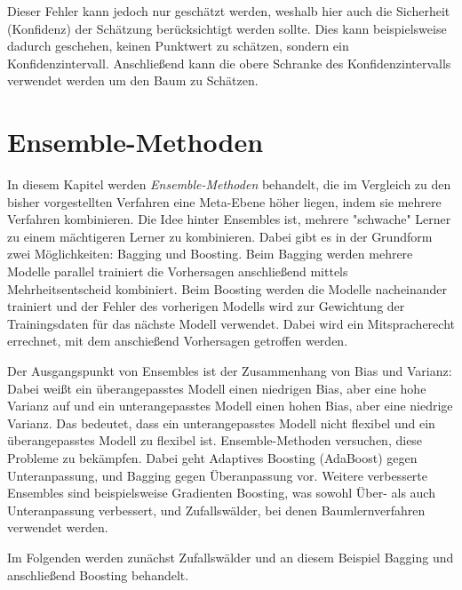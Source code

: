 		Dieser Fehler kann jedoch nur geschätzt werden, weshalb hier auch die Sicherheit (Konfidenz) der Schätzung berücksichtigt werden sollte. Dies kann beispielsweise dadurch geschehen, keinen Punktwert zu schätzen, sondern ein Konfidenzintervall. Anschließend kann die obere Schranke des Konfidenzintervalls verwendet werden um den Baum zu Schätzen.


\chapter{Ensemble-Methoden}
	In diesem Kapitel werden \emph{Ensemble-Methoden} behandelt, die im Vergleich zu den bisher vorgestellten Verfahren eine Meta-Ebene höher liegen, indem sie mehrere Verfahren kombinieren. Die Idee hinter Ensembles ist, mehrere "schwache" Lerner zu einem mächtigeren Lerner zu kombinieren. Dabei gibt es in der Grundform zwei Möglichkeiten: Bagging und Boosting. Beim Bagging werden mehrere Modelle parallel trainiert die Vorhersagen anschließend \bspw mittels Mehrheitsentscheid kombiniert. Beim Boosting werden die Modelle nacheinander trainiert und der Fehler des vorherigen Modells wird zur Gewichtung der Trainingsdaten für das nächste Modell verwendet. Dabei wird ein Mitspracherecht errechnet, mit dem anschießend Vorhersagen getroffen werden.

	Der Ausgangspunkt von Ensembles ist der Zusammenhang von Bias und Varianz: Dabei weißt ein überangepasstes Modell einen niedrigen Bias, aber eine hohe Varianz auf und ein unterangepasstes Modell einen hohen Bias, aber eine niedrige Varianz. Das bedeutet, dass ein unterangepasstes Modell nicht flexibel und ein überangepasstes Modell zu flexibel ist. Ensemble-Methoden versuchen, diese Probleme zu bekämpfen. Dabei geht Adaptives Boosting (AdaBoost) gegen Unteranpassung, und Bagging gegen Überanpassung vor. Weitere verbesserte Ensembles sind beispielsweise Gradienten Boosting, was sowohl Über- als auch Unteranpassung verbessert, und Zufallswälder, bei denen Baumlernverfahren verwendet werden.

	Im Folgenden werden zunächst Zufallswälder und an diesem Beispiel Bagging und anschließend Boosting behandelt.

